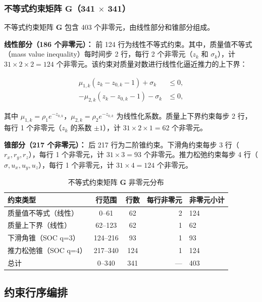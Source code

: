 \subsubsection{\texorpdfstring{不等式约束矩阵 $\bm{G}$（341 $\times$ 341）}{不等式约束矩阵 G (341 x 341)}}

不等式约束矩阵 $\bm{G}$ 包含 403 个非零元，由线性部分和锥部分组成。

\textbf{线性部分（186 个非零元）：} 前 124 行为线性不等式约束。其中，质量值不等式（mass value inequality）每时间步 2 行，每行 2 个非零元（$z_k$ 和 $\sigma_k$），计 $31 \times 2 \times 2 = 124$ 个非零元。该约束对质量对数进行线性化逼近推力的上下界：

\begin{align}
\mu_{1,k} (z_k - z_{0,k} - 1) + \sigma_k &\leq 0, \\
-\mu_{2,k} (z_k - z_{0,k} - 1) - \sigma_k &\leq 0,
\end{align}

其中 $\mu_{1,k} = \rho_1 e^{-z_{0,k}}$，$\mu_{2,k} = \rho_2 e^{-z_{0,k}}$ 为线性化系数。质量上下界约束每步 2 行，每行 1 个非零元（$z_k$ 的系数 $\pm 1$），计 $31 \times 2 \times 1 = 62$ 个非零元。

\textbf{锥部分（217 个非零元）：} 后 217 行为二阶锥约束。下滑角约束每步 3 行（$r_x, r_y, r_z$），每行 1 个非零元，计 $31 \times 3 = 93$ 个非零元。推力松弛约束每步 4 行（$\sigma, u_x, u_y, u_z$），每行 1 个非零元，计 $31 \times 4 = 124$ 个非零元。

\begin{table}[H]
\centering
\caption{不等式约束矩阵 $\bm{G}$ 非零元分布}
\label{tab:gnnz}
\begin{tabular}{lccrl}
\toprule
约束类型 & 行范围 & 行数 & 每行非零元 & 非零元小计 \\
\midrule
质量值不等式（线性） & 0--61   & 62  & 2 & 124 \\
质量上下界（线性） & 62--123  & 62  & 1 & 62 \\
下滑角锥（SOC q=3） & 124--216 & 93  & 1 & 93 \\
推力松弛锥（SOC q=4） & 217--340 & 124 & 1 & 124 \\
\midrule
总计 & 0--340   & 341 & --- & 403 \\
\bottomrule
\end{tabular}
\end{table}

\subsection{约束行序编排}

